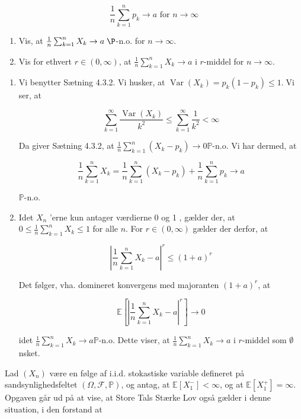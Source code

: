 \documentclass{Class}
\begin{document}
$$
\frac{1}{n} \sum_{k=1}^n p_k \rightarrow a \text { for } n \rightarrow \infty
$$
\begin{enumerate}
    \item Vis, at $\frac{1}{n}\sum_{k=1}^{n}X_k\rightarrow a\; \P$-n.o. for $n\rightarrow \infty$.
    \item Vis for ethvert $r\in(0,\infty)$, at $ \frac{1}{n}\sum_{k=1}^{n}X_k\rightarrow a$ i $r$-middel for $n\rightarrow \infty$.
\end{enumerate}
\solution
\begin{enumerate}
    \item Vi benytter Sætning 4.3.2. Vi husker, at $\operatorname{Var}\left(X_k\right)=p_k\left(1-p_k\right) \leq 1 . \operatorname{Vi}$ ser, at

    $$
    \sum_{k=1}^{\infty} \frac{\operatorname{Var}\left(X_k\right)}{k^2} \leq \sum_{k=1}^{\infty} \frac{1}{k^2}<\infty
    $$
    
    
    Da giver Sætning 4.3.2, at $\frac{1}{n} \sum_{k=1}^n\left(X_k-p_k\right) \rightarrow 0 \mathbb{P}$-n.o. Vi har dermed, at
    
    $$
    \frac{1}{n} \sum_{k=1}^n X_k=\frac{1}{n} \sum_{k=1}^n\left(X_k-p_k\right)+\frac{1}{n} \sum_{k=1}^n p_k \rightarrow a
    $$
    
    $\mathbb{P}$-n.o.
    \item Idet $X_n$ 'erne kun antager værdierne 0 og 1 , gælder der, at $0 \leq \frac{1}{n} \sum_{k=1}^n X_k \leq 1$ for alle $n$. For $r \in(0, \infty)$ gælder der derfor, at

    $$
    \left|\frac{1}{n} \sum_{k=1}^n X_k-a\right|^r \leq(1+a)^r
    $$
    
    
    Det følger, vha. domineret konvergens med majoranten $(1+a)^r$, at
    
    $$
    \mathbb{E}\left[\left|\frac{1}{n} \sum_{k=1}^n X_k-a\right|^r\right] \rightarrow 0
    $$
    
    idet $\frac{1}{n} \sum_{k=1}^n X_k \rightarrow a \mathbb{P}$-n.o. Dette viser, at $\frac{1}{n} \sum_{k=1}^n X_k \rightarrow a$ i $r$-middel som $\emptyset$ nsket.
\end{enumerate}
Lad $\left(X_n\right)$ være en følge af i.i.d. stokastiske variable defineret på sandsynlighedsfeltet $(\Omega, \mathcal{F}, \mathbb{P})$, og antag, at $\mathbb{E}\left[X_1^{-}\right]<\infty$, og at $\mathbb{E}\left[X_1^{+}\right]=\infty$. Opgaven går ud på at vise, at Store Tals Stærke Lov også gælder i denne situation, i den forstand at
\end{document}
